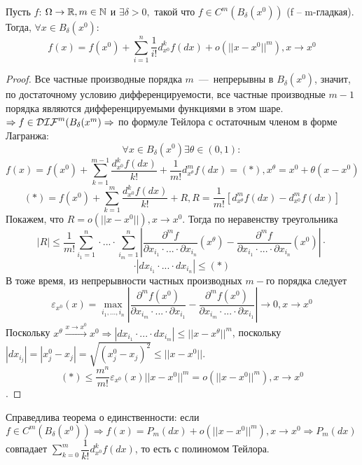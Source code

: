 \begin{theorem}
    Пусть $f$: $\Omega \rightarrow \mathbb{R}, m \in \mathbb{N}$ и $\exists \delta > 0, $ такой что $f \in C^m(B_\delta(x^0))$ (f -- m-гладкая). Тогда, $\forall x \in B_{\delta}(x^0):$ 
    \[f(x) = f(x^0) + \sum\limits_{i = 1}^n \frac{1}{i!}d^k_{x^0} f(dx) + o(||x - x^0||^m), x \rightarrow x^0\]
\end{theorem}
\begin{proof}
    Все частные производные порядка $m$~---~непрерывны в $B_{\delta}(x^0)$, значит, по достаточному условию дифференцируемости, все частные производные $m - 1$ порядка являются дифференцируемыми функциями в этом шаре. $\Rightarrow f \in \mathcal{DIF}^m(B_{\delta}(x^m) \Rightarrow$ по формуле Тейлора с остаточным членом в форме Лагранжа:
    \[\forall x \in B_{\delta}(x^0) \exists \theta \in (0, 1):\]
    \[f(x) = f(x^0) + \sum\limits_{k = 1}^{m - 1} \dfrac{d_{x^0}^k f(dx)}{k!} + \dfrac{1}{m!} d_{x^\theta}^m f(dx) = (*), x^\theta = x^0 + \theta(x - x^0)\]
    \[(*) = f(x^0) + \sum\limits_{k = 1}^m \dfrac{d_{x^0}^k f(dx)}{k!} + R, R = \dfrac{1}{m!}[d_{x^\theta}^m f(dx) - d_{x^0}^m f(dx)]\]
    Покажем, что $R = o(||x - x^0||), x \rightarrow x^0$. Тогда по неравенству треугольника
    \[|R| \leq \dfrac{1}{m!}\sum\limits_{i_1 = 1}^n \cdot ... \cdot \sum\limits_{i_m = 1}^n| \dfrac{\partial^m f}{\partial x_{i_1} \cdot ... \cdot \partial x_{i_n}}(x^\theta) - \dfrac{\partial^m f}{\partial x_{i_1} \cdot ... \cdot \partial x_{i_n}}(x^0)| \cdot\]
    \[\cdot |dx_{i_1} \cdot ... \cdot dx_{i_n}| \leq (*)\]
    В тоже время, из непрерывности частных производных $m-$го порядка следует
    \[\varepsilon_{x^0}(x) = \max\limits_{i_1, ..., i_n} |\dfrac{\partial^m f(x^0)}{\partial x_{i_m} \cdot ... \cdot \partial x_{i_1}} - \dfrac{\partial^m f(x^0)}{\partial x_{i_m} \cdot ... \cdot \partial x_{i_1}}| \rightarrow 0, x \rightarrow x^0\]
    Поскольку $x^\theta \xrightarrow{x \rightarrow x^0} x^0 \Rightarrow |dx_{i_1}\cdot ... \cdot dx_{i_m}| \leq ||x - x^\theta||^m$, поскольку $|dx_{i_j}| = |x_j^0 - x_j| = \sqrt{(x^0_j - x_j)^2} \leq ||x - x^0||$. 
    \[(*) \leq \dfrac{m^n}{m!} \varepsilon_{x^0} (x) ||x - x^0||^m = o(||x - x^0||^m), x \rightarrow x^0\].
\end{proof}
\begin{note}
    Справедлива теорема о единственности: если $f \in C^m(B_\delta(x^0)) \Rightarrow f(x) = P_m(dx) + o(||x - x^0||^m), x \rightarrow x^0 \Rightarrow P_m(dx)$ совпадает $\sum\limits_{k = 0}^m \dfrac{1}{k!}  d_{x^0}^k f(dx)$, то есть с полиномом Тейлора.
\end{note}
